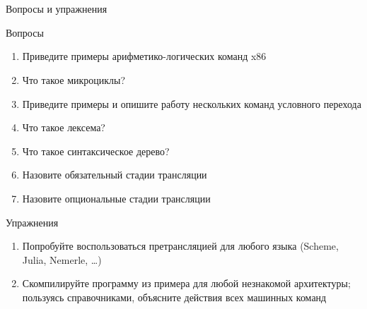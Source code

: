 \documentclass[xetex,aspectratio=43]{beamer}
\begin{document}
\section*{}

\begin{frame}{Вопросы и упражнения}
    \begin{block}{Вопросы}
        \protect\hypertarget{ux432ux43eux43fux440ux43eux441ux44b}{}
        \begin{enumerate}
            \tightlist
            \item
            Приведите примеры арифметико-логических команд x86
            \item
            Что такое микроциклы?
            \item
            Приведите примеры и опишите работу нескольких команд условного
            перехода
            \item
            Что такое лексема?
            \item
            Что такое синтаксическое дерево?
            \item
            Назовите обязательный стадии трансляции
            \item
            Назовите опциональные стадии трансляции
        \end{enumerate}
    \end{block}

    \begin{block}{Упражнения}
        \protect\hypertarget{ux443ux43fux440ux430ux436ux43dux435ux43dux438ux44f}{}
        \begin{enumerate}
            \tightlist
            \item
            Попробуйте воспользоваться претрансляцией для любого языка (Scheme,
            Julia, Nemerle, \ldots)
            \item
            Скомпилируйте программу из примера для любой незнакомой архитектуры;
            пользуясь справочниками, объясните действия всех машинных команд
        \end{enumerate}
    \end{block}
\end{frame}

\postamble
\end{document}
